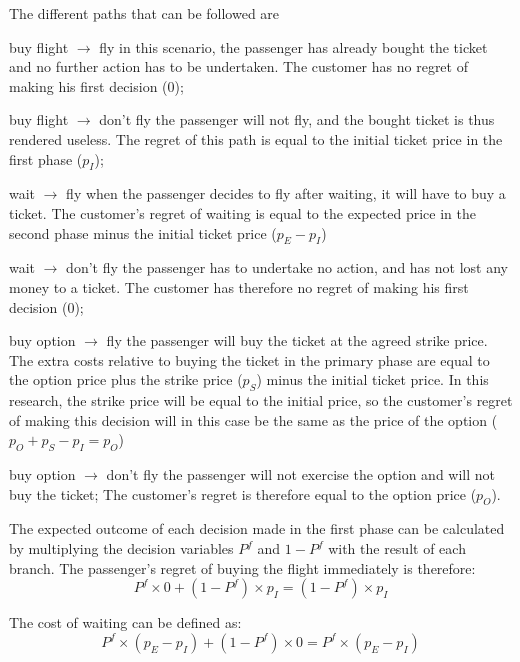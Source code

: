 \noindent
The different paths that can be followed are
\begin{compactdesc}
\item[buy flight $\rightarrow$ fly] in this scenario, the passenger has already bought the ticket and no further action has to be undertaken. The customer has no regret of making his first decision ($0$);
\item[buy flight $\rightarrow$ don't fly] the passenger will not fly, and the bought ticket is thus rendered useless. The regret of this path is equal to the initial ticket price in the first phase ($p_I$);
\item[wait $\rightarrow$ fly] when the passenger decides to fly after waiting, it will have to buy a ticket. The customer's regret of waiting is equal to the expected price in the second phase minus the initial ticket price ($p_E - p_I$)
\item[wait $\rightarrow$ don't fly] the passenger has to undertake no action, and has not lost any money to a ticket. The customer has therefore no regret of making his first decision ($0$);
\item[buy option $\rightarrow$ fly] the passenger will buy the ticket at the agreed strike price. The extra costs relative to buying the ticket in the primary phase are equal to the option price plus the strike price ($p_S$) minus the initial ticket price. In this research, the strike price will be equal to the initial price, so the customer's regret of making this decision will in this case be the same as the price of the option ($p_O + p_S - p_I = p_O$)
\item[buy option $\rightarrow$ don't fly] the passenger will not exercise the option and will not buy the ticket; The customer's regret is therefore equal to the option price ($p_O$).
\vspace{1ex}
\end{compactdesc}

The expected outcome of each decision made in the first phase can be calculated by multiplying the decision variables $P^f$ and $1 - P^f$ with the result of each branch. The passenger's regret of buying the flight immediately is therefore:
\begin{equation*}
P^f \times 0 + (1 - P^f) \times p_I = (1 - P^f) \times p_I
\end{equation*}

The cost of waiting can be defined as:
\begin{equation*}
P^f \times (p_E - p_I) + (1 - P^f) \times 0 = P^f \times (p_E - p_I)
\end{equation*}

